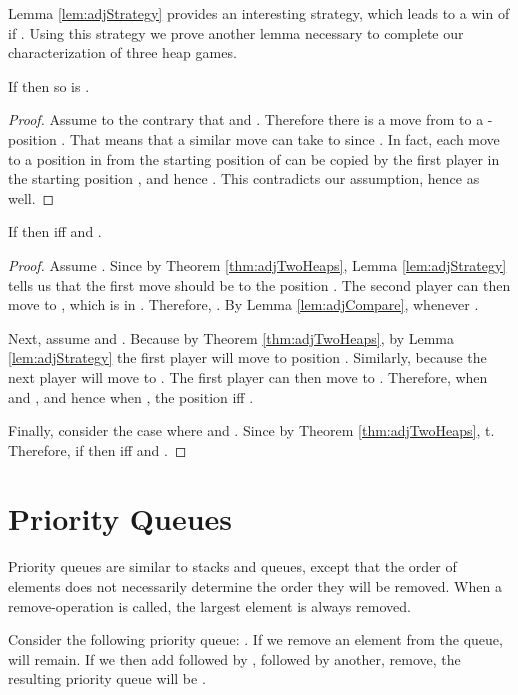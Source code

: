 \documentclass[letter,10pt]{article}
\begin{document}
Lemma \ref{lem:adjStrategy} provides an interesting strategy, which leads to a win of if . Using this strategy we prove another lemma necessary to complete our characterization of three heap games. 

\begin{lemma}\label{lem:adjCompare}
If  then so is .
\end{lemma}
\begin{proof}
Assume to the contrary that  and . Therefore there is a move from  to a -position . That means that a similar move can take  to  since . In fact, each move to a position in  from the starting position of  can be copied by the first player in the starting position , and hence . This contradicts our assumption, hence  as well.
\end{proof}

\begin{theorem}\label{thm:adjThreeHeaps2}
If  then  iff  and .
\end{theorem}
\begin{proof}
Assume . Since  by Theorem \ref{thm:adjTwoHeaps}, Lemma \ref{lem:adjStrategy} tells us that the first move should be to the position . The second player can then move to , which is in . Therefore, . By Lemma \ref{lem:adjCompare},  whenever .

Next, assume  and . Because  by Theorem \ref{thm:adjTwoHeaps}, by Lemma \ref{lem:adjStrategy} the first player will move to position . Similarly, because  the next player will move to . The first player can then move to . Therefore,  when  and , and hence when , the position  iff . 

Finally, consider the case where  and . Since  by Theorem \ref{thm:adjTwoHeaps}, t. Therefore, if  then  iff  and .
\end{proof}


\section{Priority Queues}
\label{section:priorityQueues}

Priority queues are similar to stacks and queues, except that the order of elements does not necessarily determine the order they will be removed.  When a remove-operation is called, the largest element is always removed.

Consider the following priority queue: .  If we remove an element from the queue,  will remain.  If we then add  followed by , followed by another, remove, the resulting priority queue will be .
\end{document}
